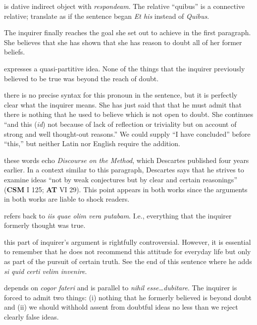  is dative indirect object with \textit{respondeam}. The relative ``quibus'' is a connective relative; translate as if the sentence began \textit{Et his} instead of \textit{Quibus}.

 The inquirer finally reaches the goal she set out to achieve in the first paragraph. She believes that she has shown that she has reason to doubt all of her former beliefs.

 expresses a quasi-partitive idea. None of the things that the inquirer previously believed to be true was beyond the reach of doubt.

 there is no precise syntax for this pronoun in the sentence, but it is perfectly clear what the inquirer means. She has just said that that he must admit that there is nothing that he used to believe which is not open to doubt. She continues ``and this (\textit{id}) not because of lack of reflection or triviality but on account of strong and well thought-out reasons.'' We could supply ``I have concluded'' before ``this,'' but neither Latin nor English require the addition.

 these words echo \textit{Discourse on the Method}, which Descartes published four years earlier. In a context similar to this paragraph, Descartes says that he strives to examine ideas ``not by weak conjectures but by clear and certain reasonings'' (\textbf{CSM} I 125; \textbf{AT} VI 29). This point appears in both works since the arguments in both works are liable to shock readers.

 refers back to \textit{iis quae olim vera putabam}. I.e., everything that the inquirer formerly thought was true.

 this part of inquirer's argument is rightfully controversial. However, it is essential to remember that he does not recommend this attitude for everyday life but only as part of the pursuit of certain truth. See the end of this sentence where he adds \textit{si quid certi velim invenire}.

 depends on \textit{cogor fateri} and is parallel to \textit{nihil esse\dots dubitare}. The inquirer is forced to admit two things: (i) nothing that he formerly believed is beyond doubt and (ii) we should withhold assent from doubtful ideas no less than we reject clearly false ideas.

